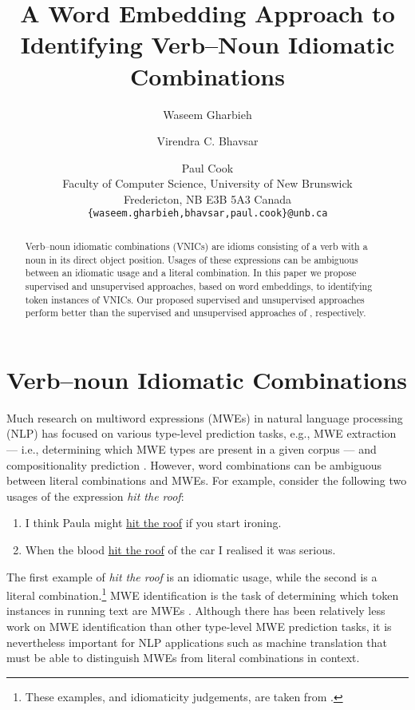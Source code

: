 \documentclass[11pt]{article}
\title{A Word Embedding Approach to Identifying Verb--Noun Idiomatic Combinations}
\author{Waseem Gharbieh \and Virendra C. Bhavsar \and Paul Cook\\
 Faculty of Computer Science, University of New Brunswick\\
Fredericton, NB E3B 5A3 Canada\\
{\tt \{waseem.gharbieh,bhavsar,paul.cook\}@unb.ca}}
\date{}
\newcommand{\VNICs}{VNICs\xspace}
\begin{document}
\maketitle
\begin{abstract}
Verb--noun idiomatic combinations (\VNICs) are idioms consisting of a
verb with a noun in its direct object position. Usages of these
expressions can be ambiguous between an idiomatic usage and a literal
combination. In this paper we propose supervised and unsupervised
approaches, based on word embeddings, to identifying token instances
of \VNICs. Our proposed supervised and unsupervised approaches perform
better than the supervised and unsupervised approaches of
\cite{Fazly2009}, respectively.
\end{abstract}


\section{Verb--noun Idiomatic Combinations}

Much research on multiword expressions (MWEs) in natural language
processing (NLP) has focused on various type-level prediction tasks,
e.g., MWE extraction \citep[e.g.,][]{Church1990,Smadja:1993,Lin1999}
--- i.e., determining which MWE types
are present in a given corpus \citep{Baldwin:Kim:2009} --- and
compositionality prediction
\citep[e.g.,][]{McCarthy2003,Reddy+:2011,Salehi+:2014a}. However, word
combinations can be ambiguous between literal combinations and
MWEs. For example, consider the following two usages of the expression
\emph{hit the roof}:

\begin{enumerate}
\item I think Paula might \underline{hit the roof} if you
  start ironing.

\item When the blood \underline{hit the roof} of the car I
  realised it was serious.
\end{enumerate}

\noindent
The first example of \emph{hit the roof} is an idiomatic usage, while
the second is a literal combination.\footnote{These examples, and
  idiomaticity judgements, are taken from \cite{Cook2008}.} MWE
identification is the task of determining which token instances in
running text are MWEs \citep{Baldwin:Kim:2009}. Although there has
been relatively less work on MWE identification than other type-level
MWE prediction tasks, it is nevertheless important for NLP
applications such as machine translation that must be able to
distinguish MWEs from literal combinations in context.
\end{document}
